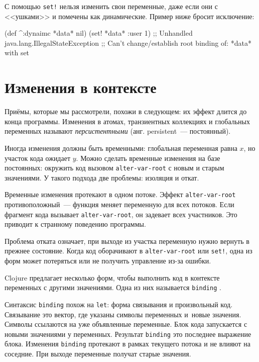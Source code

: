С помощью \verb|set!| нельзя изменить свои переменные, даже если они с
<<ушками>> и помечены как динамические. Пример ниже бросит исключение:

\begin{english}
  \begin{clojure}
(def ^:dynaimc *data* nil)
(set! *data* {:user 1})
;; Unhandled java.lang.IllegalStateException
;; Can't change/establish root binding of: *data* with set
  \end{clojure}
\end{english}

\section{Изменения в контексте}


Приёмы, которые мы рассмотрели, похожи в следующем: их эффект длится до конца
программы. Изменения в атомах, транзиентных коллекциях и глобальных переменных
называют \emph{персистентными} (анг. persistent~--- постоянный).

Иногда изменения должны быть временными: глобальная переменная равна $x$, но
участок кода ожидает $y$. Можно сделать временные изменения на базе постоянных:
окружить код вызовом \verb|alter-var-root| с новым и старым значениями. У
такого подхода две проблемы: изоляция и откат.


Временные изменения протекают в одном потоке. Эффект \verb|alter-var-root|
противоположный~--- функция меняет переменную для всех потоков. Если фрагмент
кода вызывает \verb|alter-var-root|, он задевает всех участников. Это приводит
к странному поведению программы.

Проблема отката означает, при выходе из участка переменную нужно вернуть в
прежнее состояние. Когда код оборачивают в \verb|alter-var-root| или
\verb|set!|, одна из форм может потеряться или не получить управление из-за
ошибки.

Clojure предлагает несколько форм, чтобы выполнить код в контексте переменных с
другими значениями. Одна из них называется \verb|binding| .


Синтаксис \verb|binding| похож на \verb|let|: форма связывания и
произвольный код. Связывание это вектор, где указаны символы переменных и~новые
значения. Символы ссылаются на уже объявленные переменные. Блок кода запускается
с новыми значениями у переменных. Результат \verb|binding| это последнее
выражение блока. Изменения \verb|binding| протекают в рамках текущего потока и
не влияют на соседние. При выходе переменные получат старые значения.

